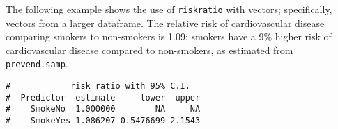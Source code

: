 \documentclass[letterpaper,12pt,twoside,]{pinp}
\begin{document}
The following example shows the use of \texttt{riskratio} with vectors;
specifically, vectors from a larger dataframe. The relative risk of
cardiovascular disease comparing smokers to non-smokers is 1.09; smokers
have a 9\% higher risk of cardiovascular disease compared to
non-smokers, as estimated from \texttt{prevend.samp}.

\begin{Shaded}
\begin{Highlighting}[]
\NormalTok{(}\NormalTok{)}

\OperatorTok{$}\StringTok{ }\OperatorTok{$} \NormalTok{(}\NormalTok{, }\NormalTok{),}
                              \NormalTok{(}\NormalTok{, }\NormalTok{))}
\OperatorTok{$}\StringTok{ }\OperatorTok{$} \NormalTok{(}\NormalTok{, }\NormalTok{),}
                           \NormalTok{(}\NormalTok{, }\NormalTok{))}

\OperatorTok{$}\OperatorTok{$}\OperatorTok{$}
\end{Highlighting}
\end{Shaded}

\begin{ShadedResult}
\begin{verbatim}
#            risk ratio with 95% C.I.
#  Predictor  estimate     lower  upper
#    SmokeNo  1.000000        NA     NA
#    SmokeYes 1.086207 0.5476699 2.1543
\end{verbatim}
\end{ShadedResult}

\begin{Shaded}
\begin{Highlighting}[]
\OperatorTok{$}\OperatorTok{$}\OperatorTok{$}
\end{Highlighting}
\end{Shaded}
\end{document}
